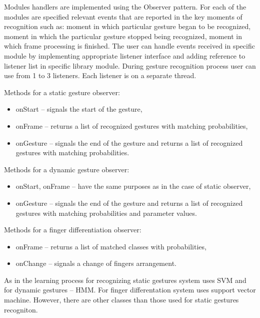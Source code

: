 Modules handlers are implemented using the Observer pattern. For each of the modules are specified relevant events that are reported in the key moments of recognition such as: moment in which particular gesture began to be recognized, moment in which the particular gesture stopped being recognized, moment in which frame processing is finished.
The user can handle events received in specific module by implementing appropriate listener interface and adding reference to listener list in specific library module. During gesture recognition process user can use from 1 to 3 listeners. Each listener is on a separate thread.

Methods for a static gesture observer:
\begin {itemize}
\item onStart -- signals the start of the gesture,
\item onFrame -- returns a list of recognized gestures with matching probabilities,
\item onGesture -- signals the end of the gesture and returns a list of recognized gestures with matching probabilities.
\end {itemize}

Methods for a dynamic gesture observer:
\begin {itemize}
\item onStart, onFrame -- have the same purposes as in the case of static observer,
\item onGesture -- signals the end of the gesture and returns a list of recognized gestures with matching probabilities and parameter values.
\end {itemize}

Methods for a finger differentiation observer:
\begin {itemize}
\item onFrame -- returns a list of matched classes with probabilities,
\item onChange -- signals a change of fingers arrangement.
\end {itemize}

As in the learning process for recognizing static gestures system uses SVM and for dynamic gestures -- HMM. For finger differentation system uses support vector machine. However, there are other classes than those used for static gestures recogniton.

